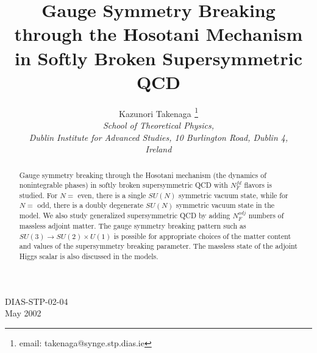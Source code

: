 \documentclass[a4paper,12pt]{article}
\begin{document}
\title{Gauge Symmetry Breaking through the Hosotani Mechanism in 
Softly Broken Supersymmetric QCD}
\author{Kazunori Takenaga \vspace{1cm}$^{}$\thanks {email: 
takenaga@synge.stp.dias.ie}\\ 
\it {School of Theoretical Physics,}\\ 
{\it Dublin Institute for Advanced Studies, 10 Burlington Road, 
Dublin 4,}\\
{\it Ireland}}
\date{} %
\maketitle
\baselineskip=18pt
\vskip 2cm
\begin{abstract}
Gauge symmetry breaking through the Hosotani mechanism (the 
dynamics of nonintegrable phases) in softly 
broken supersymmetric QCD with $N_F^{fd}$ flavors is studied. 
For $N=$ even, there is a single $SU(N)$ symmetric vacuum 
state, while for $N=$ odd, there is a doubly degenerate 
$SU(N)$ symmetric vacuum state in the model. 
We also study generalized supersymmetric 
QCD by adding $N_F^{adj}$ numbers of massless 
adjoint matter. The gauge symmetry breaking pattern
such as $SU(3)\rightarrow SU(2)\times U(1)$ 
is possible for appropriate choices of the matter content and 
values of the supersymmetry breaking parameter. 
The massless state of the adjoint 
Higgs scalar is also discussed in the models.
\end{abstract}
\vskip 2cm
\begin{flushleft}
DIAS-STP-02-04\\
May 2002\\
\end{flushleft}
\begin{center}
\end{center}
\addtolength{\parindent}{2pt}
\newpage
\end{document}
